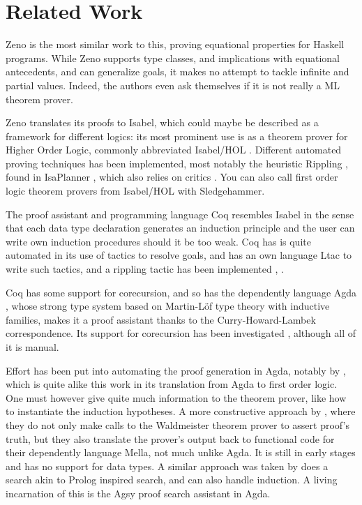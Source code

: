 \section{Related Work}


Zeno \citep{zeno} is the most similar work to this, proving equational
properties for Haskell programs. While Zeno supports type classes, and
implications with equational antecedents, and can generalize goals, it
makes no attempt to tackle infinite and partial values. Indeed, the
authors even ask themselves if it is not really a ML theorem prover.

 Zeno translates its
proofs to Isabel, which could maybe be described as a framework for
different logics: its most prominent use is as a theorem prover for
Higher Order Logic, commonly abbreviated Isabel/HOL
\citep{isabelbook}. Different automated proving techniques has been
implemented, most notably the heuristic Rippling \citep{dixonphd},
found in IsaPlanner \citep{isaplanner}, which also relies on critics
\citep{productiveuse}. You can also call first order logic theorem
provers from Isabel/HOL with Sledgehammer.

The proof assistant and programming language Coq resembles Isabel in
the sense that each data type declaration generates an induction
principle and the user can write own induction procedures should it be
too weak. Coq has is quite automated in its use of tactics to resolve
goals, and has an own language Ltac to write such tactics, and a
rippling tactic has been implemented \citep{automateddtfp},
\citep{inductioncoq}.

Coq has some support for corecursion, and so has the dependently
language Agda \citep{norell:thesis}, whose strong type system based on
Martin-Löf type theory \citep{mltt} with inductive families, makes it a proof
assistant thanks to the Curry-Howard-Lambek correspondence. Its
support for corecursion has been investigated \citep{productivity},
although all of it is manual.

Effort has been put into automating the proof generation in Agda,
notably by \cite{agdaatp}, which is quite alike this work in its
translation from Agda to first order logic. One must however give
quite much information to the theorem prover, like how to instantiate
the induction hypotheses.  A more constructive approach by \cite{dtatp}, where they
do not only make calls to the Waldmeister theorem prover to assert
proof's truth, but they also translate the prover's output back to
functional code for their dependently language Mella, not much unlike
Agda. It is still in early stages and has no support for data
types. A similar approach was taken by \cite{agsy}
does a search akin to Prolog inspired search, and can also handle
induction. A living incarnation of this is the Agsy proof search
assistant in Agda.

